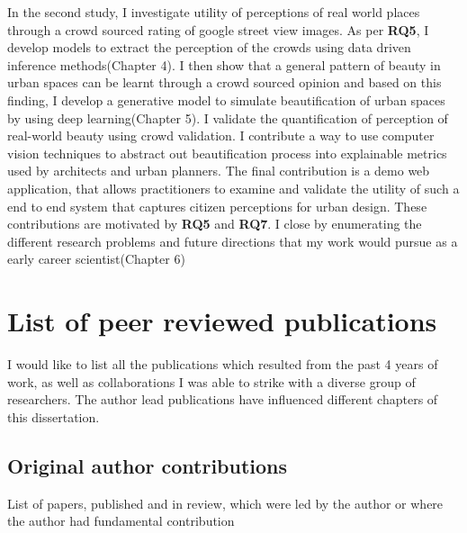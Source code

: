 In the second study, I investigate utility of perceptions of real world places through a crowd sourced rating of google street view images. As per \textbf{RQ5}, I develop models to extract the perception of the crowds using data driven inference methods(Chapter 4). 
I then show that a general pattern of beauty in urban spaces can be learnt through a crowd sourced opinion and based on this finding, I develop a generative model to simulate beautification of urban spaces by using deep learning(Chapter 5). I validate the quantification of perception of real-world beauty using crowd validation. I contribute a way to use computer vision techniques to abstract out beautification process into explainable metrics used by architects and urban planners. The final contribution is a demo web application, that allows practitioners to examine and validate the utility of such a end to end system that captures citizen perceptions for urban design. These contributions are motivated by \textbf{RQ5} and \textbf{RQ7}. 
I close by enumerating the different research problems and future directions that my work would pursue as a early career scientist(Chapter 6)



\section{List of peer reviewed publications}

I would like to list all the publications which resulted from the past 4 years of work, as well as collaborations I was able to strike with a diverse group of researchers. The author lead publications have influenced different chapters of this dissertation.

\subsection{Original author contributions}
List of papers, published and in review, which were led by the author or where the author had fundamental contribution

